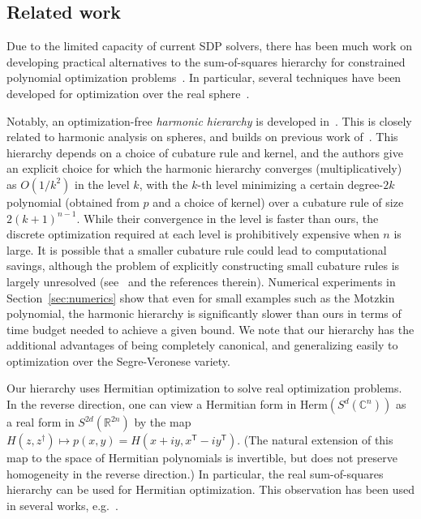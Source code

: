 \documentclass[11pt]{article}
\numberwithin{theorem}{section}
\theoremstyle{definition}
\renewcommand{\t}{{\scriptscriptstyle\mathsf{T}}}
\newcommand{\setft}[1]{\mathrm{#1}}
\newcommand{\Herm}{\setft{Herm}}
\newcommand{\complex}{\mathbb{C}}
\newcommand{\real}{\mathbb{R}}
\newcommand{\dg}{\dagger}
\begin{document}
\subsection{Related work}\label{sec:related_work}

Due to the limited capacity of current SDP solvers, there has been much work on developing practical alternatives to the sum-of-squares hierarchy for constrained polynomial optimization problems~\cite{helmberg2000spectral,chandrasekaran2016relative,lasserre2017bounded,dressler2017positivstellensatz,AM19,wang2020second,mai2022exploiting,mai2023hierarchy,cristancho2024harmonic}. In particular, several techniques have been developed for optimization over the real sphere~\cite{doherty2012convergence,laurent2019notes,fang2021sum,cristancho2024harmonic}.

Notably, an optimization-free \textit{harmonic hierarchy} is developed in~\cite{cristancho2024harmonic}. This is closely related to harmonic analysis on spheres, and builds on previous work of~\cite{blekherman2004convexity,fang2021sum,slot2022sum,slot2023sum}. This hierarchy depends on a choice of cubature rule and kernel, and the authors give an explicit choice for which the harmonic hierarchy converges (multiplicatively) as $O(1/k^2)$ in the level $k$, with the $k$-th level minimizing a certain degree-$2k$ polynomial (obtained from $p$ and a choice of kernel) over a cubature rule of size $2(k+1)^{n-1}$. While their convergence in the level is faster than ours, the discrete optimization required at each level is prohibitively expensive when $n$ is large. It is possible that a smaller cubature rule could lead to computational savings, although the problem of explicitly constructing small cubature rules is largely unresolved (see~\cite{cristancho2024harmonic} and the references therein). Numerical experiments in Section~\ref{sec:numerics} show that even for small examples such as the Motzkin polynomial, the harmonic hierarchy is significantly slower than ours in terms of time budget needed to achieve a given bound. We note that our hierarchy has the additional advantages of being completely canonical, and generalizing easily to optimization over the Segre-Veronese variety.

Our hierarchy uses Hermitian optimization to solve real optimization problems. In the reverse direction, one can view a Hermitian form in $\Herm(S^d(\complex^n))$ as a real form in $S^{2d}(\real^{2n})$ by the map $H(z,z^\dg)\mapsto p(x,y)=H(x+iy,x^\t-iy^\t)$. (The natural extension of this map to the space of Hermitian polynomials is invertible, but does not preserve homogeneity in the reverse direction.) In particular, the real sum-of-squares hierarchy can be used for Hermitian optimization. This observation has been used in several works, e.g.~\cite{d2009polynomial,harrow2017improved,fang2021sum,wang2023real}.
\end{document}
